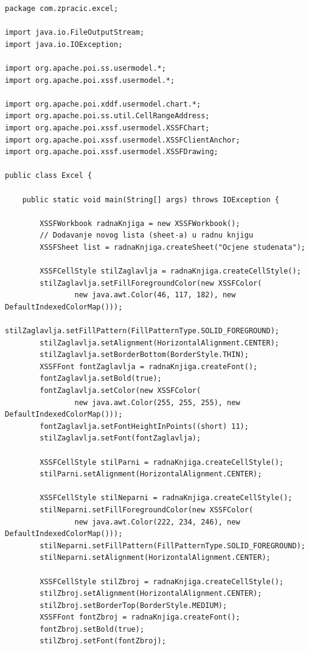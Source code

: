 \documentclass[]{foi}
\begin{document}
\begin{lstlisting}[style=Java, caption=Excel izvještaj]
package com.zpracic.excel;

import java.io.FileOutputStream;
import java.io.IOException;

import org.apache.poi.ss.usermodel.*;
import org.apache.poi.xssf.usermodel.*;

import org.apache.poi.xddf.usermodel.chart.*;
import org.apache.poi.ss.util.CellRangeAddress;
import org.apache.poi.xssf.usermodel.XSSFChart;
import org.apache.poi.xssf.usermodel.XSSFClientAnchor;
import org.apache.poi.xssf.usermodel.XSSFDrawing;

public class Excel {

    public static void main(String[] args) throws IOException {

        XSSFWorkbook radnaKnjiga = new XSSFWorkbook();
        // Dodavanje novog lista (sheet-a) u radnu knjigu
        XSSFSheet list = radnaKnjiga.createSheet("Ocjene studenata");

        XSSFCellStyle stilZaglavlja = radnaKnjiga.createCellStyle();
        stilZaglavlja.setFillForegroundColor(new XSSFColor(
                new java.awt.Color(46, 117, 182), new DefaultIndexedColorMap()));
        stilZaglavlja.setFillPattern(FillPatternType.SOLID_FOREGROUND);
        stilZaglavlja.setAlignment(HorizontalAlignment.CENTER);
        stilZaglavlja.setBorderBottom(BorderStyle.THIN);
        XSSFFont fontZaglavlja = radnaKnjiga.createFont();
        fontZaglavlja.setBold(true);
        fontZaglavlja.setColor(new XSSFColor(
                new java.awt.Color(255, 255, 255), new DefaultIndexedColorMap()));
        fontZaglavlja.setFontHeightInPoints((short) 11);
        stilZaglavlja.setFont(fontZaglavlja);

        XSSFCellStyle stilParni = radnaKnjiga.createCellStyle();
        stilParni.setAlignment(HorizontalAlignment.CENTER);

        XSSFCellStyle stilNeparni = radnaKnjiga.createCellStyle();
        stilNeparni.setFillForegroundColor(new XSSFColor(
                new java.awt.Color(222, 234, 246), new DefaultIndexedColorMap()));
        stilNeparni.setFillPattern(FillPatternType.SOLID_FOREGROUND);
        stilNeparni.setAlignment(HorizontalAlignment.CENTER);

        XSSFCellStyle stilZbroj = radnaKnjiga.createCellStyle();
        stilZbroj.setAlignment(HorizontalAlignment.CENTER);
        stilZbroj.setBorderTop(BorderStyle.MEDIUM);
        XSSFFont fontZbroj = radnaKnjiga.createFont();
        fontZbroj.setBold(true);
        stilZbroj.setFont(fontZbroj);



\end{lstlisting}
\end{document}
